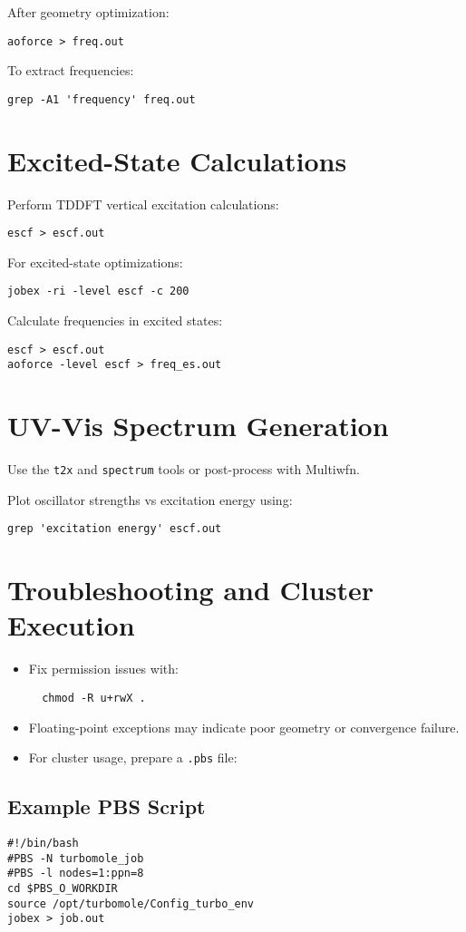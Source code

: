 After geometry optimization:

\begin{verbatim}
aoforce > freq.out
\end{verbatim}

To extract frequencies:

\begin{verbatim}
grep -A1 'frequency' freq.out
\end{verbatim}

\section{Excited-State Calculations}

Perform TDDFT vertical excitation calculations:

\begin{verbatim}
escf > escf.out
\end{verbatim}

For excited-state optimizations:

\begin{verbatim}
jobex -ri -level escf -c 200
\end{verbatim}

Calculate frequencies in excited states:

\begin{verbatim}
escf > escf.out
aoforce -level escf > freq_es.out
\end{verbatim}

\section{UV-Vis Spectrum Generation}

Use the \texttt{t2x} and \texttt{spectrum} tools or post-process with Multiwfn.

Plot oscillator strengths vs excitation energy using:

\begin{verbatim}
grep 'excitation energy' escf.out
\end{verbatim}

\section{Troubleshooting and Cluster Execution}

\begin{itemize}
  \item Fix permission issues with:
  \begin{verbatim}
  chmod -R u+rwX .
  \end{verbatim}
  \item Floating-point exceptions may indicate poor geometry or convergence failure.
  \item For cluster usage, prepare a \texttt{.pbs} file:
\end{itemize}

\subsection*{Example PBS Script}

\begin{verbatim}
#!/bin/bash
#PBS -N turbomole_job
#PBS -l nodes=1:ppn=8
cd $PBS_O_WORKDIR
source /opt/turbomole/Config_turbo_env
jobex > job.out
\end{verbatim}
